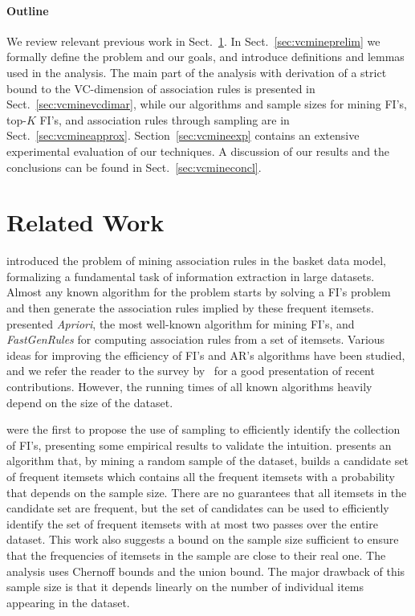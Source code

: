\paragraph{Outline}
We review relevant previous work in Sect.~\ref{sec:vcmineprevwork}. In
Sect.~\ref{sec:vcmineprelim} we formally define the problem
and our goals, and introduce definitions and lemmas used in the analysis. The
main part of the analysis with derivation of a strict bound to the VC-dimension
of association rules is presented in Sect.~\ref{sec:vcminevcdimar}, while our
algorithms and sample sizes for mining FI's, top-$K$ FI's, and association rules
through sampling are in Sect.~\ref{sec:vcmineapprox}. Section~\ref{sec:vcmineexp} contains
an extensive experimental evaluation of our techniques. A discussion of our
results and the conclusions can be found in Sect.~\ref{sec:vcmineconcl}.

\section{Related Work}\label{sec:vcmineprevwork}
\citet{AgrawalIS93} introduced the problem of mining association
rules in the basket data model, formalizing a fundamental task of information
extraction in large datasets. Almost any known algorithm for the problem starts
by solving a FI's problem and then generate the association rules implied by
these frequent itemsets. \citet{AgrawalS94} presented
\emph{Apriori}, the most well-known algorithm for mining FI's, and
\emph{FastGenRules} for computing association rules from a set of itemsets.
Various ideas for improving the efficiency of FI's and AR's algorithms have been
studied, and we refer the reader to the survey by~\citet{CeglarR06} for a good presentation of recent contributions.
However, the running times of all known algorithms heavily depend on the size of
the dataset.  

\citet{MannilaTV94} were the first to propose the 
use of sampling to efficiently identify the collection of FI's, presenting some empirical
results to validate the intuition. \citet{Toivonen96} presents an
algorithm that, by mining a random sample of the dataset, builds a candidate set
of frequent itemsets which contains all the frequent itemsets with a probability
that depends on the sample size. There are no guarantees that all itemsets
in the candidate set are frequent, but the set of candidates can be used to
efficiently identify the set of frequent itemsets with at most two passes over
the entire dataset. This work also suggests a bound on the sample size sufficient
to ensure that the frequencies of itemsets in the sample are close to their real
one. The analysis uses Chernoff bounds and the union bound. The major drawback
of this sample size is that it depends linearly on the number of individual
items appearing in the dataset.

